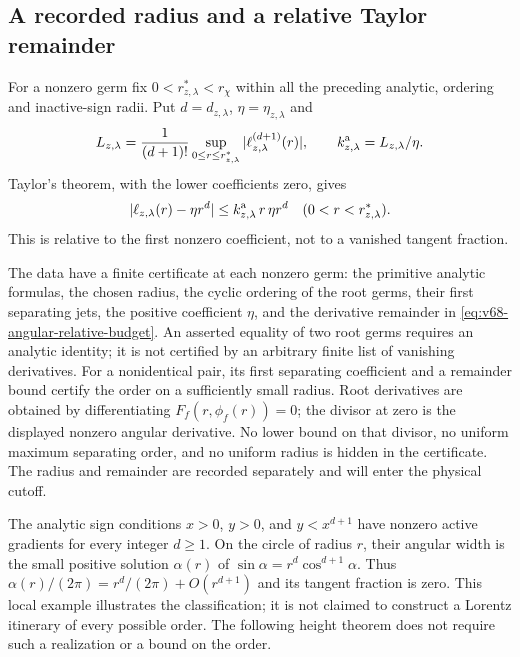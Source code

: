 \subsection{A recorded radius and a relative Taylor remainder}
For a nonzero germ fix $0<r_{z,\lambda}^*<r_\chi$ within all the
preceding analytic, ordering and inactive-sign radii. Put $d=d_{z,\lambda}$,
$\eta=\eta_{z,\lambda}$ and
\begin{equation}\label{eq:v68-angular-relative-budget}
 L_{z,\lambda}=\frac{1}{(d+1)!}
       \sup_{0\le r\le r_{z,\lambda}^*}
                       |\ell_{z,\lambda}^{(d+1)}(r)|,
 \qquad k_{z,\lambda}^{\rm a}=L_{z,\lambda}/\eta.
\end{equation}
Taylor's theorem, with the lower coefficients zero, gives
\begin{equation}\label{eq:v68-relative-angular-type}
 |\ell_{z,\lambda}(r)-\eta r^d|
          \le k_{z,\lambda}^{\rm a}\,r\,\eta r^d
                  \quad(0<r<r_{z,\lambda}^*).
\end{equation}
This is relative to the first nonzero coefficient, not to a vanished
tangent fraction.

The data have a finite certificate at each nonzero germ: the primitive
analytic formulas, the chosen radius, the cyclic ordering of the root
germs, their first separating jets, the positive coefficient $\eta$,
and the derivative remainder in \eqref{eq:v68-angular-relative-budget}.
An asserted equality of two root germs requires an analytic identity;
it is not certified by an arbitrary finite list of vanishing derivatives.
For a nonidentical pair, its first separating coefficient and a remainder
bound certify the order on a sufficiently small radius. Root derivatives
are obtained by differentiating $F_f(r,\phi_f(r))=0$; the divisor at
zero is the displayed nonzero angular derivative. No lower bound on
that divisor, no uniform maximum separating order, and no uniform
radius is hidden in the certificate. The radius and remainder are
recorded separately and will enter the physical cutoff.

\begin{remark}
\label{rem:v68-high-order-birth}
The analytic sign conditions $x>0$, $y>0$, and $y<x^{d+1}$ have
nonzero active gradients for every integer $d\ge1$. On the circle
of radius $r$, their angular width is the small positive solution
$\alpha(r)$ of
$\sin\alpha=r^d\cos^{d+1}\alpha$. Thus
$\alpha(r)/(2\pi)=r^d/(2\pi)+O(r^{d+1})$ and its tangent fraction
is zero. This local example illustrates the classification; it is not
claimed to construct a Lorentz itinerary of every possible order.
The following height theorem does not require such a realization or
a bound on the order.
\end{remark}
